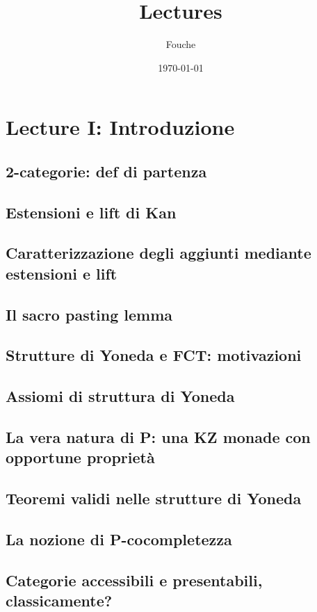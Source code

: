 \documentclass[11pt]{article}
\author{Fouche}
\date{\today}
\title{Lectures}
\begin{document}
\maketitle
\tableofcontents


\section{Lecture I: Introduzione}
\label{sec:orgb53d0f5}
\subsection{2-categorie: def di partenza}
\label{sec:org9aa8a8e}
\subsection{Estensioni e lift di Kan}
\label{sec:org39136f6}
\subsection{Caratterizzazione degli aggiunti mediante estensioni e lift}
\label{sec:org9220f4a}
\subsection{Il sacro pasting lemma}
\label{sec:orgbd10d2c}
\subsection{Strutture di Yoneda e FCT: motivazioni}
\label{sec:orgd78a6dc}
\subsection{Assiomi di struttura di Yoneda}
\label{sec:org03469d8}
\subsection{La vera natura di P: una KZ monade con opportune proprietà}
\label{sec:org064869f}
\subsection{Teoremi validi nelle strutture di Yoneda}
\label{sec:org9aa5bb5}
\subsection{La nozione di P-cocompletezza}
\label{sec:org388883e}
\subsection{Categorie accessibili e presentabili, classicamente?}
\label{sec:org91b1759}
\end{document}

